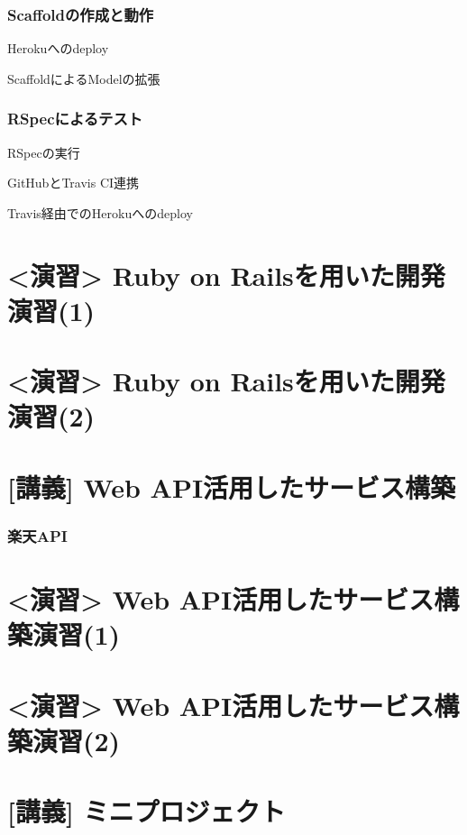 \documentclass[t, aspectratio=169]{beamer}
\begin{document}
\section{Scaffoldの作成と動作}
\label{sec-10-2}
\begin{frame}[label=sec-10-2-1]{Herokuへのdeploy}
\end{frame}
\begin{frame}[label=sec-10-2-2]{ScaffoldによるModelの拡張}
\end{frame}
\section{RSpecによるテスト}
\label{sec-10-3}
\begin{frame}[label=sec-10-3-1]{RSpecの実行}
\end{frame}
\begin{frame}[label=sec-10-3-2]{GitHubとTravis CI連携}
\end{frame}
\begin{frame}[label=sec-10-3-3]{Travis経由でのHerokuへのdeploy}
\end{frame}
\part{<演習> Ruby on Railsを用いた開発演習(1)}
\label{sec-11}
\part{<演習> Ruby on Railsを用いた開発演習(2)}
\label{sec-12}
\part{[講義] Web API活用したサービス構築}
\label{sec-13}
\section{楽天API}
\label{sec-13-1}
\part{<演習> Web API活用したサービス構築演習(1)}
\label{sec-14}
\part{<演習> Web API活用したサービス構築演習(2)}
\label{sec-15}
\part{[講義] ミニプロジェクト}
\label{sec-16}
\end{document}
